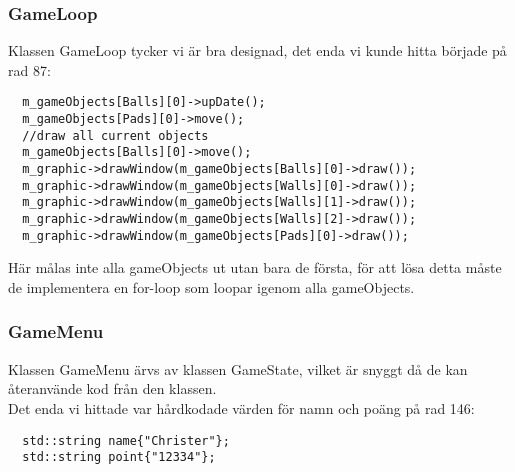 \documentclass{TDP003mall}
\begin{document}
\subsubsection{GameLoop}
Klassen GameLoop tycker vi är bra designad, det enda vi kunde hitta började på rad 87:
\begin{frame}[]
\begin{lstlisting}
  m_gameObjects[Balls][0]->upDate();
  m_gameObjects[Pads][0]->move();
  //draw all current objects
  m_gameObjects[Balls][0]->move();
  m_graphic->drawWindow(m_gameObjects[Balls][0]->draw());
  m_graphic->drawWindow(m_gameObjects[Walls][0]->draw());
  m_graphic->drawWindow(m_gameObjects[Walls][1]->draw());
  m_graphic->drawWindow(m_gameObjects[Walls][2]->draw());
  m_graphic->drawWindow(m_gameObjects[Pads][0]->draw());
\end{lstlisting}
\end{frame}

Här målas inte alla gameObjects ut utan bara de första, för att lösa detta måste de implementera en for-loop som loopar igenom alla gameObjects.

\subsubsection{GameMenu}
Klassen GameMenu ärvs av klassen GameState, vilket är snyggt då de kan återanvände kod från den klassen. \\
Det enda vi hittade var hårdkodade värden för namn och poäng på rad 146: \begin{frame}[]
\begin{lstlisting}
  std::string name{"Christer"};
  std::string point{"12334"};
\end{lstlisting}
\end{frame}

\newpage
\end{document}
